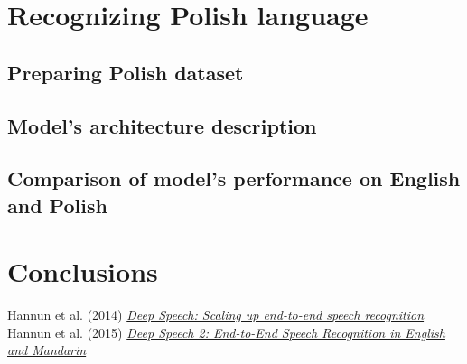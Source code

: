 \documentclass[11pt,a4paper]{article}
\begin{document}
\newpage
\section{Recognizing Polish language}
\subsection{Preparing Polish dataset}
\subsection{Model’s architecture description}
\subsection{Comparison of model's performance on English and Polish}

\newpage
\section{Conclusions}

\begin{thebibliography}{1}
   Hannun et al. (2014) \href{https://arxiv.org/pdf/1412.5567.pdf}{\em Deep Speech: Scaling up end-to-end speech recognition} 
   Hannun et al. (2015) \href{https://arxiv.org/abs/1512.02595}{\em Deep Speech 2: End-to-End Speech Recognition in English and Mandarin} 
\end{thebibliography}
  
\end{document}
